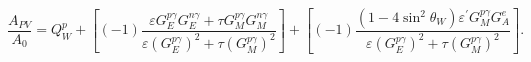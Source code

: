\begin{equation} \label{equ:qweak10}
\frac{A_{PV}}{A_{0}} = Q_{W}^{p} + \left[(-1)\frac{{\varepsilon}{G_{E}^{p\gamma}}{G_{E}^{n\gamma}} + {\tau}{G_{M}^{p\gamma}}{G_{M}^{n\gamma}} }{ {\varepsilon}({G_{E}^{p\gamma}})^{2} + {\tau}({G_{M}^{p\gamma}})^{2} } \right]  + \left[(-1)\frac{(1-4\sin^{2}\theta_{W}){\varepsilon^{\prime}}{G_{M}^{p\gamma}}{G_{A}^{e}} }{ {\varepsilon}({G_{E}^{p\gamma}})^{2} + {\tau}({G_{M}^{p\gamma}})^{2} } \right].
\end{equation}


%
%

